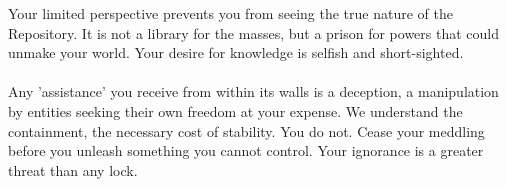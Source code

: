 \documentclass{article}
\begin{document}
\begin{infobox}
Your limited perspective prevents you from seeing the true nature of the Repository. It is not a library for the masses, but a prison for powers that could unmake your world. Your desire for knowledge is selfish and short-sighted. \\
\\
Any 'assistance' you receive from within its walls is a deception, a manipulation by entities seeking their own freedom at your expense. We understand the containment, the necessary cost of stability. You do not. Cease your meddling before you unleash something you cannot control. Your ignorance is a greater threat than any lock.
\end{infobox}
\end{document}

